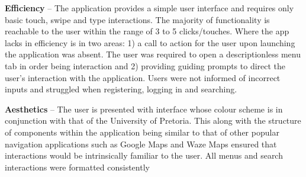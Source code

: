 \documentclass{article}
\begin{document}
		\textbf{Efficiency} – The application provides a simple user interface and requires only basic touch, swipe and type interactions. The majority of functionality is reachable to the user within the range of 3 to 5 clicks/touches. Where the app lacks in efficiency is in two areas:  1) a call to action for the user upon launching the application was absent. The user was required to open a descriptionless menu tab in order being interaction and 2) providing guiding prompts to direct the user’s interaction with the application. Users were not informed of incorrect inputs and struggled when registering, logging in and searching.\newline
		
		\textbf{Aesthetics} – The user is presented with interface whose colour scheme is in conjunction with that of the University of Pretoria. This along with the structure of components within the application being similar to that of other popular navigation applications such as Google Maps and Waze Maps ensured that interactions would be intrinsically familiar to the user. All menus and search interactions were formatted consistently \newline
\end{document}
